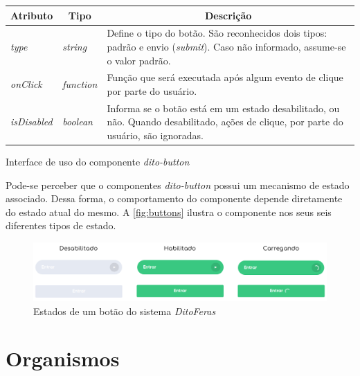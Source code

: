 \begin{quadro}
\centering
\begin{tabular}{|m{4cm}|m{3cm}|m{7cm}|} \hline
	
	\multicolumn{1}{|c|}{\bfseries Atributo} & \multicolumn{1}{c|}{\bfseries Tipo} & \multicolumn{1}{c|}{\bfseries Descrição} \\\hline
	
	 \textit{type} & \textit{string} & Define o tipo do botão. São reconhecidos dois tipos: padrão e envio (\textit{submit}). Caso não informado, assume-se o valor padrão. \\\hline
	 \textit{onClick} & \textit{function} & Função que será executada após algum evento de clique por parte do usuário. \\\hline
	 \textit{isDisabled} & \textit{boolean} & Informa se o botão está em um estado desabilitado, ou não. Quando desabilitado, ações de clique, por parte do usuário, são ignoradas. \\\hline
    
\end{tabular}
\caption{Interface de uso do componente \textit{dito-button}}
\label{table:ditoButton}
\end{quadro}

Pode-se perceber que o componentes \textit{dito-button} possui um mecanismo de estado associado. Dessa forma, o comportamento do componente depende diretamente do estado atual do mesmo. A \autoref{fig:buttons} ilustra o componente nos seus seis diferentes tipos de estado.

\begin{figure}
  \begin{center}
	  \includegraphics[width=\linewidth]{./04-figuras/06_biblioteca_componentes/buttons.png}
	\end{center}
  \caption{Estados de um botão do sistema \textit{DitoFeras}}
  \label{fig:buttons}
\end{figure}

\section{Organismos}

